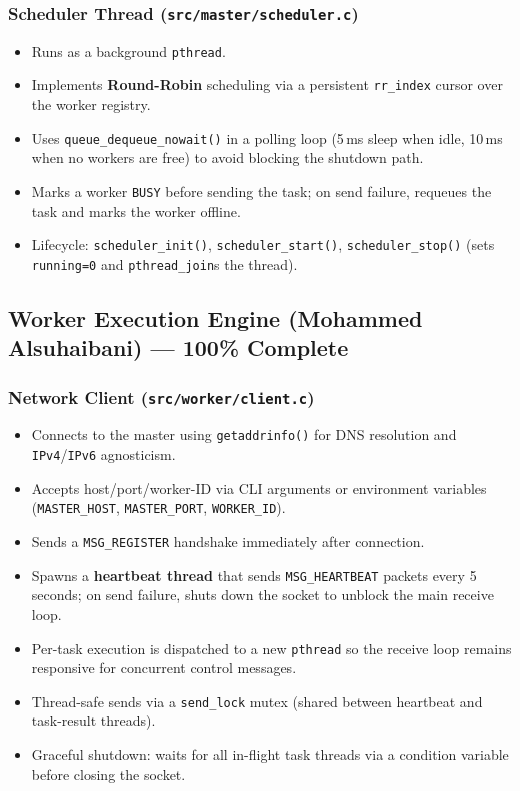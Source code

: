 \documentclass[12pt,a4paper]{article}
\begin{document}
\subsubsection{Scheduler Thread (\texttt{src/master/scheduler.c})}
\begin{itemize}[noitemsep]
    \item Runs as a background \texttt{pthread}.
    \item Implements \textbf{Round-Robin} scheduling via a persistent \texttt{rr\_index} cursor over the worker registry.
    \item Uses \texttt{queue\_dequeue\_nowait()} in a polling loop (5\,ms sleep when idle, 10\,ms when no workers are free) to avoid blocking the shutdown path.
    \item Marks a worker \texttt{BUSY} before sending the task; on send failure, requeues the task and marks the worker offline.
    \item Lifecycle: \texttt{scheduler\_init()}, \texttt{scheduler\_start()}, \texttt{scheduler\_stop()} (sets \texttt{running=0} and \texttt{pthread\_join}s the thread).
\end{itemize}

\subsection{Worker Execution Engine (Mohammed Alsuhaibani) --- 100\% Complete}

\subsubsection{Network Client (\texttt{src/worker/client.c})}
\begin{itemize}[noitemsep]
    \item Connects to the master using \texttt{getaddrinfo()} for DNS resolution and \texttt{IPv4}/\texttt{IPv6} agnosticism.
    \item Accepts host/port/worker-ID via CLI arguments or environment variables (\texttt{MASTER\_HOST}, \texttt{MASTER\_PORT}, \texttt{WORKER\_ID}).
    \item Sends a \texttt{MSG\_REGISTER} handshake immediately after connection.
    \item Spawns a \textbf{heartbeat thread} that sends \texttt{MSG\_HEARTBEAT} packets every 5 seconds; on send failure, shuts down the socket to unblock the main receive loop.
    \item Per-task execution is dispatched to a new \texttt{pthread} so the receive loop remains responsive for concurrent control messages.
    \item Thread-safe sends via a \texttt{send\_lock} mutex (shared between heartbeat and task-result threads).
    \item Graceful shutdown: waits for all in-flight task threads via a condition variable before closing the socket.
\end{itemize}
\end{document}
